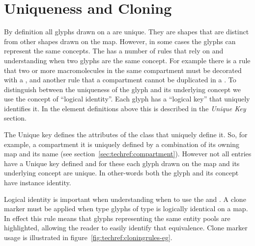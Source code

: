 \section{Uniqueness and Cloning}
\label{sec:techref:epnuniqueness}
\label{sec:techref:uniquenessdefinition}

By definition all glyphs drawn on a \PDl are unique. They are shapes
that are distinct from other shapes drawn on the map. However, in some
cases the glyphs can represent the same concepts. The \PDl has a
number of rules that rely on and understanding when two glyphs are the
same concept. For example there is a rule that two or more
macromolecules in the same compartment must be decorated with a
, and another rule that a compartment cannot be
duplicated in a \PDm.  To distinguish between the uniqueness of the
glyph and its underlying concept we use the concept of ``logical
identity''. Each glyph has a ``logical key'' that uniquely identifies
it. In the element definitions above this is described in the
\emph{Unique Key} section.

The Unique key defines the attributes of the class that uniquely
define it.  So, for example, a compartment it is uniquely defined by a
combination of its owning map and its name (see
section~\ref{sec:techref:compartment}). However not all entries have a
Unique key defined and for these each glyph drawn on the map and its
underlying concept are unique. In other-words both the glyph and its
concept have instance identity.

Logical identity is important when understanding when to use the
 and . A clone
marker must be applied when type glyphs of type 
is logically identical on a map. In effect this rule means that glyphs
representing the same entity pools are highlighted, allowing the reader
to easily identify that equivalence.  Clone marker usage is
illustrated in figure~\ref{fig:techref:cloningrules-eg}.




